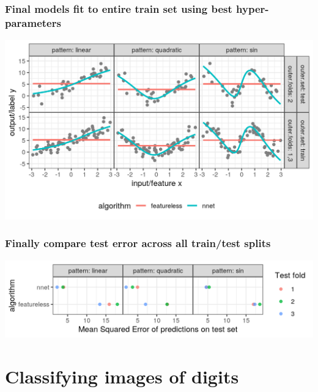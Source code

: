 \documentclass{beamer}
\begin{document}
\begin{frame}
  \frametitle{Final models fit to entire train set using best hyper-parameters}

  \includegraphics[width=\textwidth]{figure-overfitting-cv-data-test-fold-2-pred.png}
\end{frame}

\begin{frame}
  \frametitle{Finally compare test error across all train/test splits}

  \includegraphics[width=\textwidth]{figure-overfitting-cv-data.png}
\end{frame}




\section{Classifying images of digits}
\end{document}
